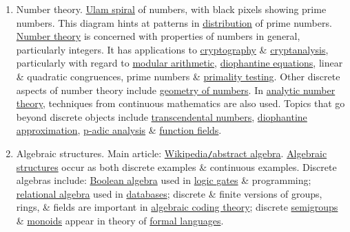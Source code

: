 \documentclass{article}
\begin{document}
\begin{enumerate}
	\item {\sf Number theory.} {\sf\href{https://en.wikipedia.org/wiki/Ulam_spiral}{Ulam spiral} of numbers, with black pixels showing prime numbers. This diagram hints at patterns in \href{https://en.wikipedia.org/wiki/Prime_number#Distribution}{distribution} of prime numbers.} \href{https://en.wikipedia.org/wiki/Number_theory}{Number theory} is concerned with properties of numbers in general, particularly integers. It has applications to \href{https://en.wikipedia.org/wiki/Cryptography}{cryptography} \& \href{https://en.wikipedia.org/wiki/Cryptanalysis}{cryptanalysis}, particularly with regard to \href{https://en.wikipedia.org/wiki/Modular_arithmetic}{modular arithmetic}, \href{https://en.wikipedia.org/wiki/Diophantine_equations}{diophantine equations}, linear \& quadratic congruences, prime numbers \& \href{https://en.wikipedia.org/wiki/Primality_test}{primality testing}. Other discrete aspects of number theory include \href{https://en.wikipedia.org/wiki/Geometry_of_numbers}{geometry of numbers}. In \href{https://en.wikipedia.org/wiki/Analytic_number_theory}{analytic number theory}, techniques from continuous mathematics are also used. Topics that go beyond discrete objects include \href{https://en.wikipedia.org/wiki/Transcendental_number}{transcendental numbers}, \href{https://en.wikipedia.org/wiki/Diophantine_approximation}{diophantine approximation}, \href{https://en.wikipedia.org/wiki/P-adic_analysis}{p-adic analysis} \& \href{https://en.wikipedia.org/wiki/Function_field_of_an_algebraic_variety}{function fields}.
	\item {\sf Algebraic structures.} Main article: \href{https://en.wikipedia.org/wiki/Abstract_algebra}{Wikipedia{\tt/}abstract algebra}. \href{https://en.wikipedia.org/wiki/Algebraic_structure}{Algebraic structures} occur as both discrete examples \& continuous examples. Discrete algebras include: \href{https://en.wikipedia.org/wiki/Boolean_algebra_(logic)}{Boolean algebra} used in \href{https://en.wikipedia.org/wiki/Logic_gate}{logic gates} \& programming; \href{https://en.wikipedia.org/wiki/Relational_algebra}{relational algebra} used in \href{https://en.wikipedia.org/wiki/Databases}{databases}; discrete \& finite versions of groups, rings, \& fields are important in \href{https://en.wikipedia.org/wiki/Algebraic_coding_theory}{algebraic coding theory}; discrete \href{https://en.wikipedia.org/wiki/Semigroup}{semigroups} \& \href{https://en.wikipedia.org/wiki/Monoid}{monoids} appear in theory of \href{https://en.wikipedia.org/wiki/Formal_languages}{formal languages}.

\end{enumerate}
\end{document}
